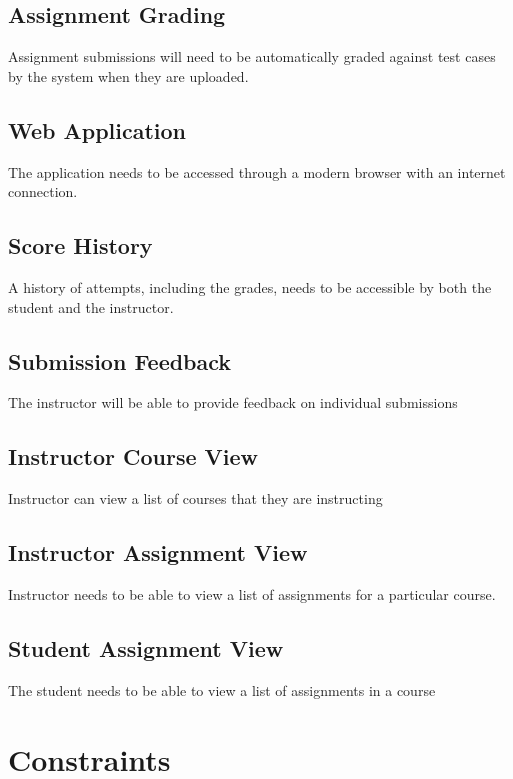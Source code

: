 \documentclass{article}
\begin{document}
\subsection{Assignment Grading}
Assignment submissions will need to be automatically graded against test cases by the system when they are uploaded.

\subsection{Web Application}
The application needs to be accessed through a modern browser with an internet connection.

\subsection{Score History}
A history of attempts, including the grades, needs to be accessible by both the student and the instructor.

\subsection{Submission Feedback}
The instructor will be able to provide feedback on individual submissions

\subsection{Instructor Course View}
Instructor can view a list of courses that they are instructing

\subsection{Instructor Assignment View}
Instructor needs to be able to view a list of assignments for a particular course.

\subsection{Student Assignment View}
The student needs to be able to view a list of assignments in a course




\section{Constraints}


\end{document}
